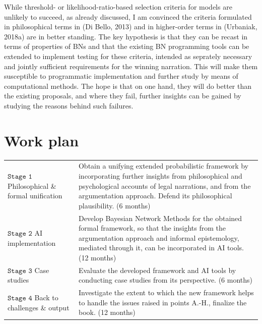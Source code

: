 \documentclass[11pt,dvipsnames,enabledeprecatedfontcommands]{scrartcl}
\begin{document}
While threshold- or likelihood-ratio-based selection criteria for models
are unlikely to succeed, as already discussed, I am convinced the
criteria formulated in philosophical terms in (Di Bello, 2013) and in
higher-order terms in (Urbaniak, 2018a) are in better standing. The key
hypothesis is that they can be recast in terms of properties of BNs and
that the existing BN programming tools can be extended to implement
testing for these criteria, intended as seprately necessary and jointly
sufficient requirements for the winning narration. This will make them
susceptible to programmatic implementation and further study by means of
computational methods. The hope is that on one hand, they will do better
than the existing proposals, and where they fail, further insights can
be gained by studying the reasons behind such failures.

\section{Work plan}\label{work-plan}

\vspace{1mm}

\begin{center}
\begin{tabular}{p{2.3cm}|p{12.2cm}}
\footnotesize \textbf{$\mathtt{Stage  \,\, 1}$} \newline  \tiny Philosophical \&  formal \newline  unification & 
Obtain a unifying extended  probabilistic framework by incorporating further insights  from philosophical and psychological accounts of legal narrations, and from the argumentation approach. Defend its philosophical plausibility. \scriptsize (6 months)
\\
\footnotesize \textbf{$\mathtt{Stage \,\, 2}$} \newline  \tiny AI implementation 
 & Develop Bayesian Network Methods for the obtained formal framework, so that the insights from the argumentation approach and informal epistemology, mediated through it, can be incorporated in AI tools. \scriptsize (12 months)
\\
\footnotesize \textbf{$\mathtt{Stage  \,\, 3}$} \newline  \tiny    Case studies & 
Evaluate the developed framework and AI tools  by conducting case studies from its perspective.    \scriptsize (6 months) 
\\
\footnotesize \textbf{$\mathtt{Stage  \,\, 4}$} \newline  \tiny    Back to challenges \& output & 
Investigate the extent to which the new framework helps to handle the issues raised in points A.-H., finalize the book. \scriptsize (12 months)
\end{tabular}
\end{center}
\end{document}
